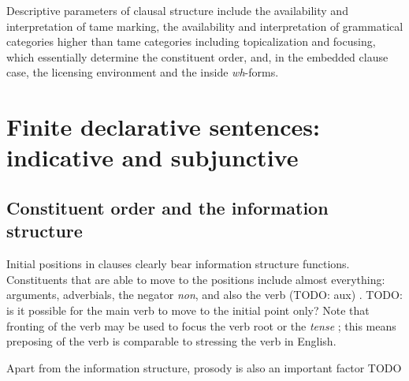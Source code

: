 \documentclass[a4paper, oneside]{report}
\newcommand*{\citesec}[1]{\S~{#1}}
\newcommand*{\citepage}[1]{p.~{#1}}
\newcommand{\form}[1]{\emph{#1}}
\begin{document}
Descriptive parameters of clausal structure include 
the availability and interpretation of \acs{tame} marking, 
the availability and interpretation of  
grammatical categories higher than \acs{tame} categories
including topicalization and focusing,
which essentially determine the constituent order, 
and, in the embedded clause case, 
the licensing environment
and the inside \form{wh}-forms.

\section{Finite declarative sentences: indicative and subjunctive}




\subsection{Constituent order and the information structure}\label{sec:clause.order}

Initial positions in clauses clearly bear information structure functions. 
Constituents that are able to move to the positions 
include almost everything: 
arguments, adverbials, the negator \form{non}, 
and also the verb (TODO: aux) 
\citep[\citesec{598}]{allen1903allen}. 
TODO: is it possible for the main verb to move to the initial point only?
Note that fronting of the verb may be used 
to focus the verb root or the \emph{tense}
\citep[\citepage{397}]{allen1903allen};
this means preposing of the verb is comparable to 
stressing the verb in English.

Apart from the information structure, 
prosody is also an important factor TODO
\end{document}
